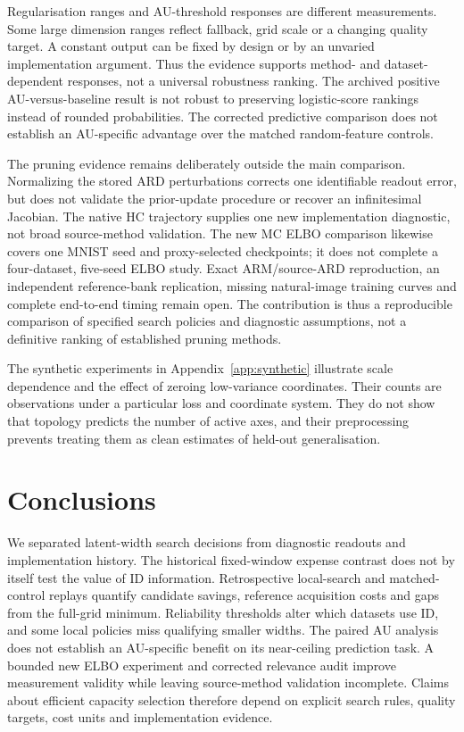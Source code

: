 Regularisation ranges and AU-threshold responses are different
measurements. Some large dimension ranges reflect fallback, grid scale
or a changing quality target. A constant output can be fixed by design
or by an unvaried implementation argument. Thus the evidence supports
method- and dataset-dependent responses, not a universal robustness
ranking. The archived positive AU-versus-baseline result is not robust
to preserving logistic-score rankings instead of rounded probabilities.
The corrected predictive comparison does not establish an AU-specific
advantage over the matched random-feature controls.

The pruning evidence remains deliberately outside the main comparison.
Normalizing the stored ARD perturbations corrects one identifiable
readout error, but does not validate the prior-update procedure or
recover an infinitesimal Jacobian. The native HC trajectory supplies
one new implementation diagnostic, not broad source-method validation.
The new MC ELBO comparison likewise covers one MNIST seed and
proxy-selected checkpoints; it does not complete a four-dataset,
five-seed ELBO study. Exact ARM/source-ARD reproduction, an independent
reference-bank replication, missing natural-image training curves and
complete end-to-end timing remain open. The contribution is thus a
reproducible comparison of specified search policies and diagnostic
assumptions, not a definitive ranking of established pruning methods.

The synthetic experiments in Appendix~\ref{app:synthetic} illustrate
scale dependence and the effect of zeroing low-variance coordinates.
Their counts are observations under a particular loss and coordinate
system. They do not show that topology predicts the number of active
axes, and their preprocessing prevents treating them as clean estimates
of held-out generalisation.

\section{Conclusions}\label{sec:conclusion}
We separated latent-width search decisions from diagnostic readouts and
implementation history. The historical fixed-window expense contrast
does not by itself test the value of ID information. Retrospective
local-search and matched-control replays quantify candidate savings,
reference acquisition costs and gaps from the full-grid minimum.
Reliability thresholds alter which datasets use ID, and some local
policies miss qualifying smaller widths. The paired AU analysis does
not establish an AU-specific benefit on its near-ceiling prediction task.
A bounded new ELBO experiment and corrected relevance audit improve
measurement validity while leaving source-method validation incomplete.
Claims about efficient capacity selection therefore depend on explicit
search rules, quality targets, cost units and implementation evidence.

